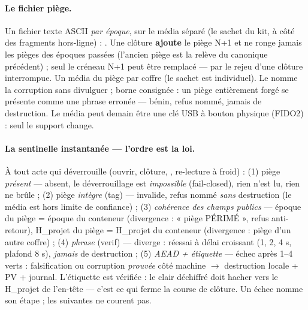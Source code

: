 \paragraph{Le fichier piège.} Un fichier texte ASCII \emph{par époque}, sur le média
séparé (le sachet du kit, à côté des fragments hors-ligne) :
. Une clôture \textbf{ajoute} le piège N+1 et ne
ronge jamais les pièges des époques passées (l'ancien piège est la relève du canonique
précédent) ; seul le créneau N+1 peut être remplacé — par le rejeu d'une clôture
interrompue. Un média du piège par coffre (le sachet est individuel). Le 
nomme la corruption sans divulguer ; borne consignée : un piège entièrement forgé se
présente comme une phrase erronée — bénin, refus nommé, jamais de destruction. Le média
peut demain être une clé USB à bouton physique (FIDO2) : seul le support change.

\paragraph{La sentinelle instantanée — l'ordre est la loi.} À tout acte qui déverrouille
(ouvrir, clôture, , re-lecture à froid) : (1) piège \emph{présent} —
absent, le déverrouillage est \emph{impossible} (fail-closed), rien n'est lu, rien ne
brûle ; (2) piège \emph{intègre} (tag) — invalide, refus nommé \emph{sans} destruction
(le média est hors limite de confiance) ; (3) \emph{cohérence des champs publics} —
époque du piège = époque du conteneur (divergence : « piège PÉRIMÉ », refus
anti-retour), H\_projet du piège = H\_projet du conteneur (divergence : piège d'un autre
coffre) ; (4) \emph{phrase} (verif) — diverge : réessai à délai croissant (1, 2, 4 s,
plafond 8 s), \emph{jamais} de destruction ; (5) \emph{AEAD + étiquette} — échec après
1--4 verts : falsification ou corruption \emph{prouvée} côté machine $\to$ destruction
locale + PV + journal. L'étiquette est vérifiée : le clair déchiffré doit hacher vers le
H\_projet de l'en-tête — c'est ce qui ferme la course de clôture. Un échec nomme son
étape ; les suivantes ne courent pas.

